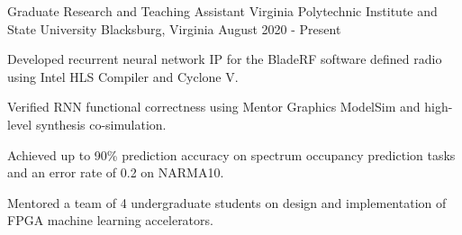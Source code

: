 


\begin{cventries}



\cventry
{Graduate Research and Teaching Assistant} %
{Virginia Polytechnic Institute and State University} %
{Blacksburg, Virginia} %
{August 2020 - Present} %
{ %
\begin{cvitems}
\item {Developed recurrent neural network IP for the BladeRF software defined radio using Intel HLS Compiler and Cyclone V.}
\item {Verified RNN functional correctness using Mentor Graphics ModelSim and high-level synthesis co-simulation.}
\item {Achieved up to 90\% prediction accuracy on spectrum occupancy prediction tasks and an error rate of 0.2 on NARMA10.}
\item{Mentored a team of 4 undergraduate students on design and implementation of FPGA machine learning accelerators.}
\end{cvitems}
}




\end{cventries}
